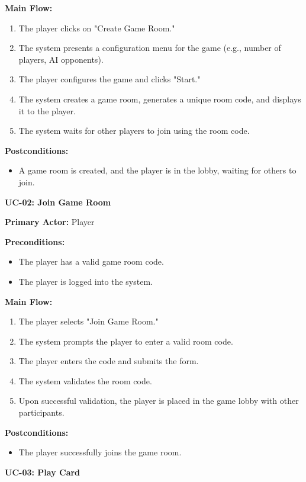 \documentclass{article}
\begin{document}
\textbf{Main Flow:}
\begin{enumerate}
    \item The player clicks on "Create Game Room."
    \item The system presents a configuration menu for the game (e.g., number of players, AI opponents).
    \item The player configures the game and clicks "Start."
    \item The system creates a game room, generates a unique room code, and displays it to the player.
    \item The system waits for other players to join using the room code.
\end{enumerate}

\textbf{Postconditions:}
\begin{itemize}
    \item A game room is created, and the player is in the lobby, waiting for others to join.
\end{itemize}

\textbf{UC-02: Join Game Room}

\textbf{Primary Actor:} Player

\textbf{Preconditions:}
\begin{itemize}
    \item The player has a valid game room code.
    \item The player is logged into the system.
\end{itemize}

\textbf{Main Flow:}
\begin{enumerate}
    \item The player selects "Join Game Room."
    \item The system prompts the player to enter a valid room code.
    \item The player enters the code and submits the form.
    \item The system validates the room code.
    \item Upon successful validation, the player is placed in the game lobby with other participants.
\end{enumerate}

\textbf{Postconditions:}
\begin{itemize}
    \item The player successfully joins the game room.
\end{itemize}

\textbf{UC-03: Play Card}
\end{document}
